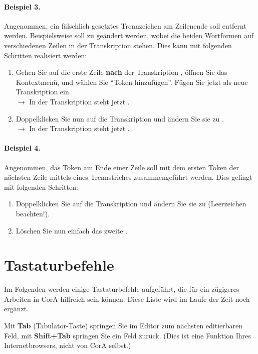 \documentclass[11pt,a4paper,parskip=half]{scrartcl}
\begin{document}
\paragraph{Beispiel 3.}  Angenommen, ein fälschlich gesetztes
Trennzeichen am Zeilenende soll entfernt werden.  Beispielsweise soll
 zu  geändert werden, wobei die beiden
Wortformen auf verschiedenen Zeilen in der Transkription stehen.  Dies
kann mit folgenden Schritten realisiert werden:
\begin{enumerate}
\item Gehen Sie auf die erste Zeile \textbf{nach} der Transkription
  , öffnen Sie das Kontextmenü, und wählen Sie
  "`Token hinzufügen"'.  Fügen Sie jetzt  als neue
  Transkription ein.\\$\to$ In der Transkription steht jetzt
  .
\item Doppelklicken Sie nun auf die Transkription 
  und ändern Sie sie zu .\\$\to$ In der Transkription steht
  jetzt .
\end{enumerate}

\paragraph{Beispiel 4.}  Angenommen, das Token  am Ende
einer Zeile soll mit dem ersten Token  der nächsten Zeile
mittels eines Trennstriches \trans{(=)} zusammengeführt werden.  Dies
gelingt mit folgenden Schritten:
\begin{enumerate}
\item Doppelklicken Sie auf die Transkription  und ändern
  Sie sie zu  (Leerzeichen beachten!).
\item Löschen Sie nun einfach das zweite .
\end{enumerate}

\vspace{2em} %
\section{Tastaturbefehle}

Im Folgenden werden einige Tastaturbefehle aufgeführt, die für ein
zügigeres Arbeiten in CorA hilfreich sein können.  Diese Liste wird im
Laufe der Zeit noch ergänzt.

Mit \textbf{Tab} (Tabulator-Taste) springen Sie im Editor zum nächsten
editierbaren Feld, mit \textbf{Shift+Tab} springen Sie ein Feld
zurück.  (Dies ist eine Funktion Ihres Internetbrowsers, nicht von
CorA selbst.)
\end{document}
